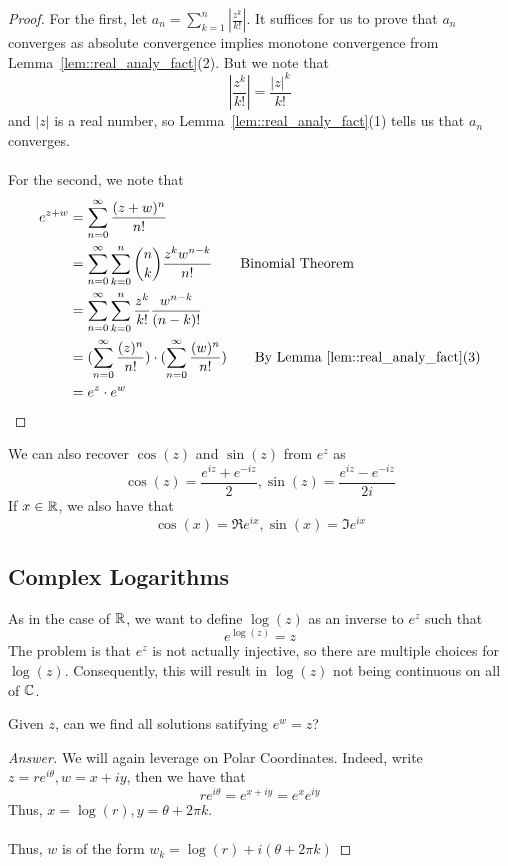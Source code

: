 \begin{proof}
For the first, let $a_n = \sum_{k = 1}^n |\frac{z^k}{k!}|$. It suffices for us to prove that $a_n$ converges as absolute convergence implies monotone convergence from Lemma~\ref{lem::real_analy_fact}(2). But we note that 
\[|\frac{z^k}{k!}| = \frac{|z|^k}{k!}\]
and $|z|$ is a real number, so Lemma~\ref{lem::real_analy_fact}(1) tells us that $a_n$ converges.\\\\
For the second, we note that
\begin{align*}
    e^{z + w} &= \sum_{n = 0}^\infty \frac{(z + w)^n}{n!}\\
    &= \sum_{n = 0}^\infty \sum_{k = 0}^n {n \choose k} \frac{z^k w^{n-k}}{n!} \tag*{Binomial Theorem}\\
    &= \sum_{n = 0}^\infty \sum_{k = 0}^n \frac{z^k}{k!} \frac{w^{n-k}}{(n - k)!}\\
    &= (\sum_{n = 0}^\infty \frac{(z)^n}{n!}) \cdot (\sum_{n = 0}^\infty \frac{(w)^n}{n!}) \tag*{By Lemma~\ref{lem::real_analy_fact}(3)}\\
    &= e^z \cdot e^w
\end{align*}
\end{proof}

\begin{proposition}
We can also recover $\cos(z)$ and $\sin(z)$ from $e^z$ as
\[\cos(z) = \frac{e^{iz} + e^{-iz}}{2}, \sin(z) = \frac{e^{iz} - e^{-iz}}{2i}\]
If $x \in \mathbb{R}$, we also have that
\[\cos(x) = \Re e^{ix}, \sin(x) = \Im e^{ix}\]
\end{proposition}

\subsection{Complex Logarithms}

As in the case of $\mathbb{R}$, we want to define $\log(z)$ as an inverse to $e^z$ such that
\[e^{\log(z)} = z\]
The problem is that $e^z$ is not actually injective, so there are multiple choices for $\log(z)$. Consequently, this will result in $\log(z)$ not being continuous on all of $\mathbb{C}$.

\begin{question}
Given $z$, can we find all solutions satifying $e^w = z$?
\end{question}

\begin{proof}[Answer]
We will again leverage on Polar Coordinates. Indeed, write $z = re^{i \theta}, w = x + iy$, then we have that
\[r e^{i \theta} = e^{x + iy} = e^{x} e^{iy}\]
Thus, $x = \log(r), y = \theta + 2 \pi k$.\\\\
Thus, $w$ is of the form $w_k = \log(r) + i(\theta + 2 \pi k)$
\end{proof}

